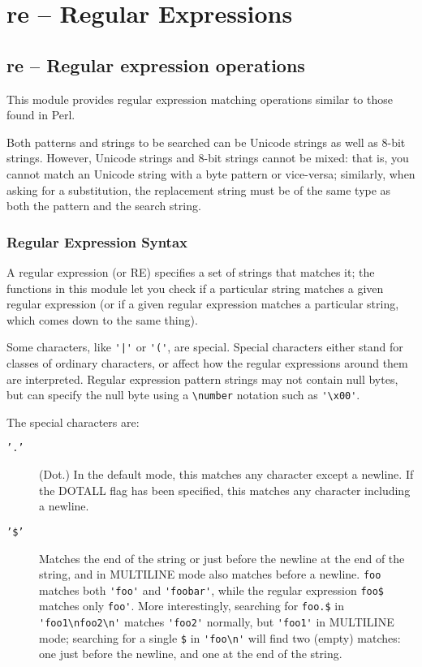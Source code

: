 
\chapter{re -- Regular Expressions}

\section{re -- Regular expression operations}

This module provides regular expression
matching operations similar to those found in Perl.

Both patterns and strings to be searched
can be Unicode strings as well as 8-bit
strings. However, Unicode strings and
8-bit strings cannot be mixed: that is,
you cannot match an Unicode string with
a byte pattern or vice-versa; similarly,
when asking for a substitution, the replacement string must
be of the same type as both the pattern and the search string.


\subsection{Regular Expression Syntax}

A regular expression (or RE) specifies
a set of strings that matches it; the
functions in this module let you check
if a particular string matches a given
regular expression (or if a given regular
expression matches a particular string,
which comes down to the same thing).

Some characters, like \verb+'|'+ or \verb+'('+, are
special. Special characters either stand
for classes of ordinary characters, or
affect how the regular expressions around
them are interpreted. Regular expression
pattern strings may not contain null bytes,
but can specify the null byte using a \verb+\number+
notation such as \verb+'\x00'+.

The special characters are:

\begin{description}

\item[\texttt{'.'}]
(Dot.) In the default mode, this matches
any character except a newline. If the
DOTALL flag has been specified, this matches
any character including a newline.

\item[\texttt{'\$'}]
Matches the end of the string or just
before the newline at the end of the string,
and in MULTILINE mode also matches before
a newline. \verb+foo+ matches both \verb+'foo'+ and
\verb+'foobar'+, while the regular expression
\verb+foo$+ matches only \verb+foo'+. More interestingly,
searching for \verb+foo.$+ in \verb+'foo1\nfoo2\n'+
matches \verb+'foo2'+ normally, but \verb+'foo1'+ in
MULTILINE mode; searching for a single
\verb+$+ in \verb+'foo\n'+ will find two (empty) matches:
one just before the newline, and one at the end of the string.

\end{description}

